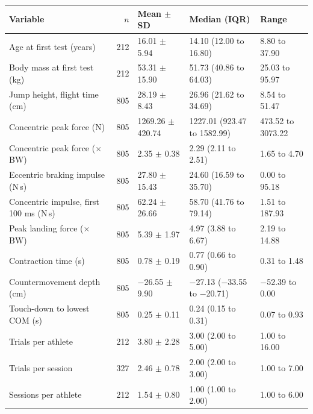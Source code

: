 \begin{tabular}{lrlll}
\toprule
Variable & $n$ & Mean $\pm$ SD & Median (IQR) & Range \\
\midrule
Age at first test (years) & 212 & 16.01 $\pm$ 5.94 & 14.10 (12.00 to 16.80) & 8.80 to 37.90 \\
Body mass at first test (kg) & 212 & 53.31 $\pm$ 15.90 & 51.73 (40.86 to 64.03) & 25.03 to 95.97 \\
Jump height, flight time (cm) & 805 & 28.19 $\pm$ 8.43 & 26.96 (21.62 to 34.69) & 8.54 to 51.47 \\
Concentric peak force (N) & 805 & 1269.26 $\pm$ 420.74 & 1227.01 (923.47 to 1582.99) & 473.52 to 3073.22 \\
Concentric peak force ($\times$\,BW) & 805 & 2.35 $\pm$ 0.38 & 2.29 (2.11 to 2.51) & 1.65 to 4.70 \\
Eccentric braking impulse (N\,s) & 805 & 27.80 $\pm$ 15.43 & 24.60 (16.59 to 35.70) & 0.00 to 95.18 \\
Concentric impulse, first 100 ms (N\,s) & 805 & 62.24 $\pm$ 26.66 & 58.70 (41.76 to 79.14) & 1.51 to 187.93 \\
Peak landing force ($\times$\,BW) & 805 & 5.39 $\pm$ 1.97 & 4.97 (3.88 to 6.67) & 2.19 to 14.88 \\
Contraction time (s) & 805 & 0.78 $\pm$ 0.19 & 0.77 (0.66 to 0.90) & 0.31 to 1.48 \\
Countermovement depth (cm) & 805 & $-$26.55 $\pm$ 9.90 & $-$27.13 ($-$33.55 to $-$20.71) & $-$52.39 to 0.00 \\
Touch-down to lowest COM (s) & 805 & 0.25 $\pm$ 0.11 & 0.24 (0.15 to 0.31) & 0.07 to 0.93 \\
Trials per athlete & 212 & 3.80 $\pm$ 2.28 & 3.00 (2.00 to 5.00) & 1.00 to 16.00 \\
Trials per session & 327 & 2.46 $\pm$ 0.78 & 2.00 (2.00 to 3.00) & 1.00 to 7.00 \\
Sessions per athlete & 212 & 1.54 $\pm$ 0.80 & 1.00 (1.00 to 2.00) & 1.00 to 6.00 \\
\bottomrule
\end{tabular}
